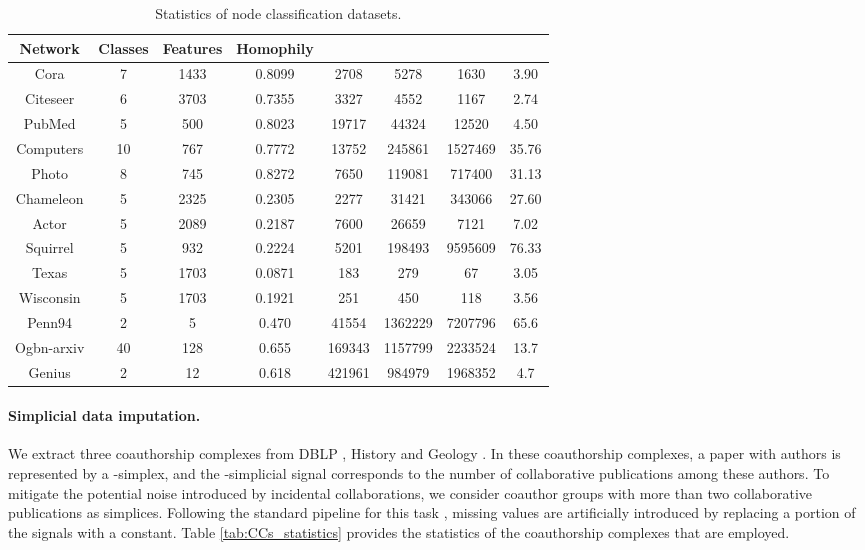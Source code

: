 \documentclass[letterpaper]{article} \usepackage{aaai24}
\theoremstyle{plain}
\theoremstyle{definition}
\theoremstyle{remark}
\begin{document}
\begin{table*}[htbp]
\centering
\begin{tabular}{cccccccc}
\toprule
Network   & Classes & Features & Homophily &   &   &   & \\
\midrule
Cora      & 7       & 1433     & 0.8099    & 2708  & 5278   & 1630      &3.90    \\
Citeseer  & 6       & 3703     & 0.7355    & 3327  & 4552   & 1167      &2.74\\
PubMed    & 5       & 500      & 0.8023    & 19717 & 44324  & 12520     &4.50\\
Computers & 10      & 767      & 0.7772    & 13752 & 245861 & 1527469   &35.76\\
Photo     & 8       & 745      & 0.8272    & 7650  & 119081 & 717400    &31.13\\
\midrule
Chameleon & 5       & 2325     & 0.2305    & 2277  & 31421  & 343066    &27.60\\
Actor     & 5       & 2089     & 0.2187    & 7600  & 26659  & 7121      &7.02\\
Squirrel  & 5       & 932      & 0.2224    & 5201  & 198493 & 9595609   &76.33\\
Texas     & 5       & 1703     & 0.0871    & 183   & 279    & 67        &3.05\\
Wisconsin & 5       & 1703     & 0.1921    & 251   & 450    & 118       &3.56\\
\midrule
Penn94    & 2       & 5        & 0.470     & 41554  & 1362229  & 7207796    &65.6\\
Ogbn-arxiv& 40       & 128        & 0.655     & 169343 & 1157799  & 2233524      &13.7\\
Genius  & 2       & 12        & 0.618     & 421961 & 984979  & 1968352   &4.7\\
\bottomrule
\end{tabular}
\caption{Statistics of node classification datasets.}
\label{tab:node_statistics}
\end{table*}



\paragraph{Simplicial data imputation.}
We extract three coauthorship complexes from DBLP \cite{data:DBLP-Benson2018}, History and Geology \cite{data:MAG-His-Geo}. In these coauthorship complexes, a paper with  authors is represented by a -simplex, and the -simplicial signal corresponds to the number of collaborative publications among these authors. 
To mitigate the potential noise introduced by incidental collaborations, we consider coauthor groups with more than two  collaborative publications as simplices. 
Following the standard pipeline for this task \cite{SNN2020}, missing values are artificially introduced by replacing a portion of the signals with a constant.
Table \ref{tab:CCs_statistics} provides the statistics of the coauthorship complexes that are employed.
\end{document}
